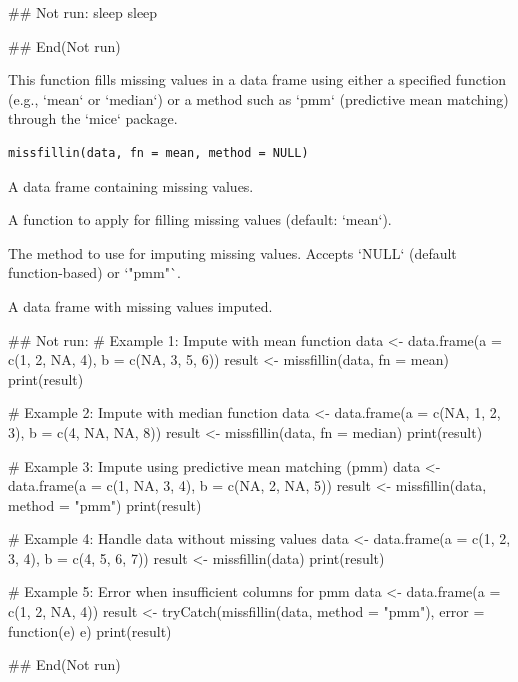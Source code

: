 \documentclass[a4paper]{book}
\begin{document}
%
\begin{Examples}
\begin{ExampleCode}
\#\# Not run: 
 sleep %
sleep %

## End(Not run)


\end{ExampleCode}
\end{Examples}
%
\begin{Description}
This function fills missing values in a data frame using either a specified function (e.g., `mean` or `median`)
or a method such as `pmm` (predictive mean matching) through the `mice` package.
\end{Description}
%
\begin{Usage}
\begin{verbatim}
missfillin(data, fn = mean, method = NULL)
\end{verbatim}
\end{Usage}
%
\begin{Arguments}
\begin{ldescription}
\item[\code{data}] A data frame containing missing values.

\item[\code{fn}] A function to apply for filling missing values (default: `mean`).

\item[\code{method}] The method to use for imputing missing values. Accepts `NULL` (default function-based) or `"pmm"`.
\end{ldescription}
\end{Arguments}
%
\begin{Value}
A data frame with missing values imputed.
\end{Value}
%
\begin{Examples}
\begin{ExampleCode}
\#\# Not run: 
# Example 1: Impute with mean function
data <- data.frame(a = c(1, 2, NA, 4), b = c(NA, 3, 5, 6))
result <- missfillin(data, fn = mean)
print(result)

# Example 2: Impute with median function
data <- data.frame(a = c(NA, 1, 2, 3), b = c(4, NA, NA, 8))
result <- missfillin(data, fn = median)
print(result)

# Example 3: Impute using predictive mean matching (pmm)
data <- data.frame(a = c(1, NA, 3, 4), b = c(NA, 2, NA, 5))
result <- missfillin(data, method = "pmm")
print(result)

# Example 4: Handle data without missing values
data <- data.frame(a = c(1, 2, 3, 4), b = c(4, 5, 6, 7))
result <- missfillin(data)
print(result)

# Example 5: Error when insufficient columns for pmm
data <- data.frame(a = c(1, 2, NA, 4))
result <- tryCatch(missfillin(data, method = "pmm"), error = function(e) e)
print(result)

## End(Not run)
\end{ExampleCode}
\end{Examples}
\end{document}
